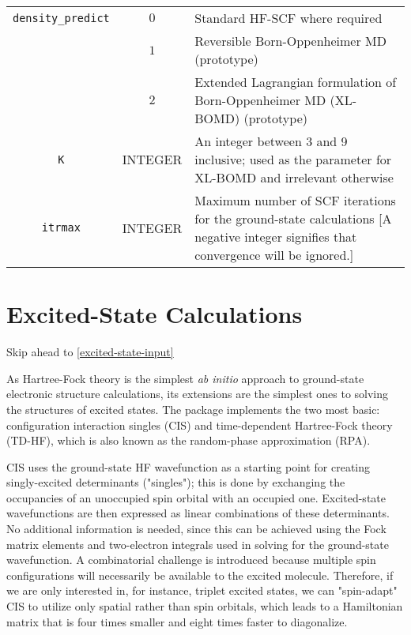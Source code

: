 \documentclass[12pt,letter,footinclude=true,headinclude=true,hyphens]{book} %
\begin{document}
    \begin{tabular}{ | c | c | p{7cm} | }
    \hline
    \texttt{density\_predict} & $0$ & Standard HF-SCF where required \\
    & $1$ & Reversible Born-Oppenheimer MD (prototype) \\
    & $2$ & Extended Lagrangian formulation of Born-Oppenheimer MD (XL-BOMD) (prototype) \\ \hline
    \texttt{K} & INTEGER & An integer between 3 and 9 inclusive; used as the parameter for XL-BOMD and irrelevant otherwise \\ \hline
    \texttt{itrmax} & INTEGER & Maximum number of SCF iterations for the ground-state calculations [A negative integer signifies that convergence will be ignored.]\\
    \hline
    \end{tabular}
    
    \section{Excited-State Calculations}
    
    Skip ahead to \ref{excited-state-input}
    
    As Hartree-Fock theory is the simplest \emph{ab initio} approach to ground-state electronic structure calculations, its extensions are the simplest ones to solving the structures of excited states. The package implements the two most basic: configuration interaction singles (CIS) and time-dependent Hartree-Fock theory (TD-HF), which is also known as the random-phase approximation (RPA).
    
    CIS uses the ground-state HF wavefunction as a starting point for creating singly-excited determinants ("singles"); this is done by exchanging the occupancies of an unoccupied spin orbital with an occupied one. Excited-state wavefunctions are then expressed as linear combinations of these determinants. No additional information is needed, since this can be achieved using the Fock matrix elements and two-electron integrals used in solving for the ground-state wavefunction. A combinatorial challenge is introduced because multiple spin configurations will necessarily be available to the excited molecule. Therefore, if we are only interested in, for instance, triplet excited states, we can "spin-adapt" CIS to utilize only spatial rather than spin orbitals, which leads to a Hamiltonian matrix that is four times smaller and eight times faster to diagonalize.
    
\end{document}
